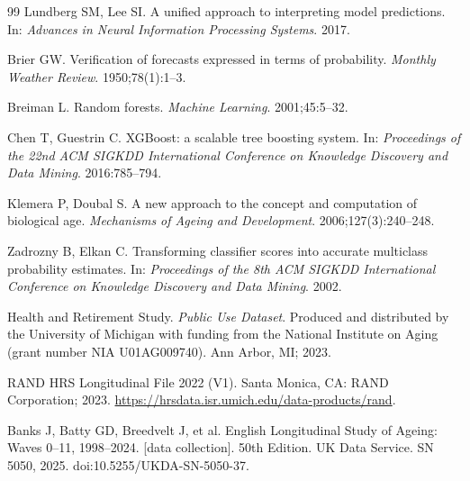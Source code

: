 \documentclass[11pt,a4paper]{article}
\begin{document}
\begin{thebibliography}{99}
 Lundberg SM, Lee SI. A unified approach to interpreting model predictions.
In: \textit{Advances in Neural Information Processing Systems}. 2017.

 Brier GW. Verification of forecasts expressed in terms of probability.
\textit{Monthly Weather Review}. 1950;78(1):1--3.

 Breiman L. Random forests. \textit{Machine Learning}. 2001;45:5--32.

 Chen T, Guestrin C. XGBoost: a scalable tree boosting system. In:
\textit{Proceedings of the 22nd ACM SIGKDD International Conference on Knowledge Discovery
and Data Mining}. 2016:785--794.

 Klemera P, Doubal S. A new approach to the concept and computation of
biological age. \textit{Mechanisms of Ageing and Development}. 2006;127(3):240--248.

 Zadrozny B, Elkan C. Transforming classifier scores into accurate multiclass
probability estimates. In: \textit{Proceedings of the 8th ACM SIGKDD International Conference on
Knowledge Discovery and Data Mining}. 2002.

 Health and Retirement Study. \textit{Public Use Dataset}. Produced and distributed
by the University of Michigan with funding from the National Institute on Aging (grant number
NIA U01AG009740). Ann Arbor, MI; 2023.

 RAND HRS Longitudinal File 2022 (V1). Santa Monica, CA: RAND Corporation; 2023.
\url{https://hrsdata.isr.umich.edu/data-products/rand}.

 Banks J, Batty GD, Breedvelt J, et al. English Longitudinal Study of Ageing:
Waves 0--11, 1998--2024. [data collection]. 50th Edition. UK Data Service. SN 5050, 2025.
doi:10.5255/UKDA-SN-5050-37.

\end{thebibliography}
\end{document}

